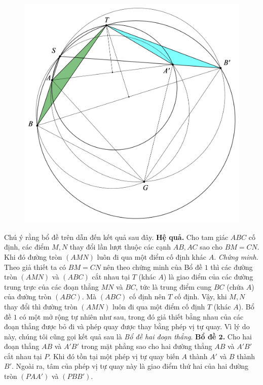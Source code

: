 \begin{multicols}{2}
\begin{figure}[H]
		\includegraphics[scale=0.63]{1}
		\vspace*{-5pt}
	\end{figure}
	Chú ý rằng bổ đề trên dẫn đến kết quả sau đây.
	\vskip 0.1cm
	\textbf{\color{diendantoanhoc}Hệ quả.} Cho tam giác $ABC$ cố định, các điểm $M,N$ thay đổi lần lượt thuộc các cạnh $AB,AC$ sao cho $BM=CN$. Khi đó đường tròn $(AMN)$ luôn đi qua một điểm cố định khác $A$.
	\vskip 0.1cm
	\textit{Chứng minh.} Theo giả thiết ta có $BM=CN$ nên theo chứng minh của Bổ đề $1$ thì các đường tròn $(AMN)$ và $(ABC)$ cắt nhau tại $T$ (khác $A$) là giao điểm của các đường trung trực của các đoạn thẳng $MN$ và $BC$, tức là trung điểm cung $BC$ (chứa $A$) của đường tròn $(ABC)$. Mà $(ABC)$ cố định nên $T$ cố định. Vậy,  khi $M,N$ thay đổi thì đường tròn $(AMN)$ luôn đi qua một điểm cố định $T$ (khác $A$).	\vskip 0.1cm
	\vskip 0.1cm
	Bổ đề $1$ có một mở rộng tự nhiên như sau, trong đó giả thiết bằng nhau của các đoạn thẳng được bỏ đi và phép quay được thay bằng phép vị tự quay. Vì lý do này, chúng tôi cũng gọi kết quả sau là \textit{Bổ đề hai đoạn thẳng}.
	\vskip 0.1cm
	\textbf{\color{diendantoanhoc}Bổ đề $\pmb{2}$.} Cho hai đoạn thẳng $AB$ và $A'B'$ trong mặt phẳng sao cho hai đường thẳng $AB$ và $A'B'$ cắt nhau tại $P$. Khi đó tồn tại một phép vị tự quay biến $A$ thành $A'$ và $B$ thành $B'$. Ngoài ra, tâm của phép vị tự quay này là giao điểm thứ hai của hai đường tròn $(PAA')$ và $(PBB')$.

\end{multicols}
